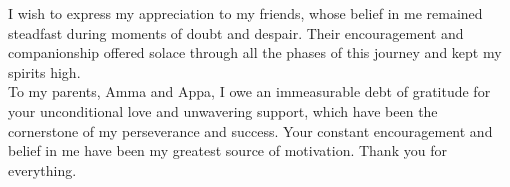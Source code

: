 I wish to express my appreciation to my friends, whose belief in me remained steadfast during moments of doubt and despair. Their encouragement and companionship offered solace through all the phases of this journey and kept my spirits high.\\

To my parents, Amma and Appa, I owe an immeasurable debt of gratitude for your unconditional love and unwavering support, which have been the cornerstone of my perseverance and success. Your constant encouragement and belief in me have been my greatest source of motivation. Thank you for everything. \\



